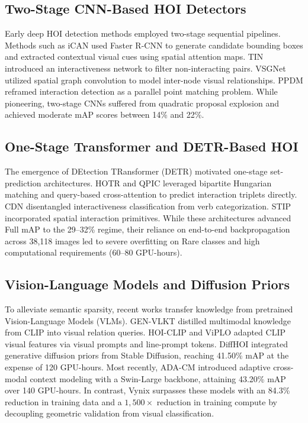 \documentclass[conference]{IEEEtran}
\begin{document}
\subsection{Two-Stage CNN-Based HOI Detectors}
Early deep HOI detection methods employed two-stage sequential pipelines. Methods such as iCAN \cite{gao2018ican} used Faster R-CNN to generate candidate bounding boxes and extracted contextual visual cues using spatial attention maps. TIN \cite{li2019tin} introduced an interactiveness network to filter non-interacting pairs. VSGNet \cite{ulutan2020vsgnet} utilized spatial graph convolution to model inter-node visual relationships. PPDM \cite{liao2020ppdm} reframed interaction detection as a parallel point matching problem. While pioneering, two-stage CNNs suffered from quadratic proposal explosion and achieved moderate mAP scores between 14\% and 22\%.

\subsection{One-Stage Transformer and DETR-Based HOI}
The emergence of DEtection TRansformer (DETR) motivated one-stage set-prediction architectures. HOTR \cite{kim2021hotr} and QPIC \cite{tamura2021qpic} leveraged bipartite Hungarian matching and query-based cross-attention to predict interaction triplets directly. CDN \cite{zhang2021cdn} disentangled interactiveness classification from verb categorization. STIP \cite{zhang2022stip} incorporated spatial interaction primitives. While these architectures advanced Full mAP to the 29--32\% regime, their reliance on end-to-end backpropagation across 38,118 images led to severe overfitting on Rare classes and high computational requirements (60--80 GPU-hours).

\subsection{Vision-Language Models and Diffusion Priors}
To alleviate semantic sparsity, recent works transfer knowledge from pretrained Vision-Language Models (VLMs). GEN-VLKT \cite{liao2022genvlkt} distilled multimodal knowledge from CLIP into visual relation queries. HOI-CLIP \cite{ning2023hoiclip} and ViPLO \cite{park2023viplo} adapted CLIP visual features via visual prompts and line-prompt tokens. DiffHOI \cite{wang2023diffhoi} integrated generative diffusion priors from Stable Diffusion, reaching 41.50\% mAP at the expense of 120 GPU-hours. Most recently, ADA-CM \cite{liu2024adacm} introduced adaptive cross-modal context modeling with a Swin-Large backbone, attaining 43.20\% mAP over 140 GPU-hours. In contrast, Vynix surpasses these models with an 84.3\% reduction in training data and a $1,500\times$ reduction in training compute by decoupling geometric validation from visual classification.
\end{document}
